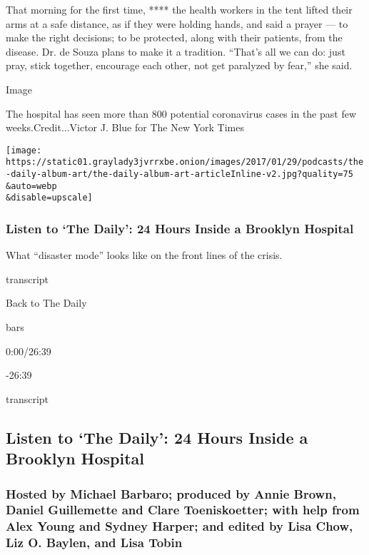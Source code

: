 That morning for the first time, **** the health workers in the tent
lifted their arms at a safe distance, as if they were holding hands, and
said a prayer --- to make the right decisions; to be protected, along
with their patients, from the disease. Dr. de Souza plans to make it a
tradition. ``That's all we can do: just pray, stick together, encourage
each other, not get paralyzed by fear,'' she said.

Image

The hospital has seen more than 800 potential coronavirus cases in the
past few weeks.Credit...Victor J. Blue for The New York Times

\texttt{[image: https://static01.graylady3jvrrxbe.onion/images/2017/01/29/podcasts/the-daily-album-art/the-daily-album-art-articleInline-v2.jpg?quality=75\\\&auto=webp\\\&disable=upscale]}

\hypertarget{listen-to-the-daily-24-hours-inside-a-brooklyn-hospital}{%
\subsubsection{Listen to `The Daily': 24 Hours Inside a Brooklyn
Hospital}\label{listen-to-the-daily-24-hours-inside-a-brooklyn-hospital}}

What ``disaster mode'' looks like on the front lines of the crisis.

transcript

Back to The Daily

bars

0:00/26:39

-26:39

transcript

\hypertarget{listen-to-the-daily-24-hours-inside-a-brooklyn-hospital-1}{%
\subsection{Listen to `The Daily': 24 Hours Inside a Brooklyn
Hospital}\label{listen-to-the-daily-24-hours-inside-a-brooklyn-hospital-1}}

\hypertarget{hosted-by-michael-barbaro-produced-by-annie-brown-daniel-guillemette-and-clare-toeniskoetter-with-help-from-alex-young-and-sydney-harper-and-edited-by-lisa-chow-liz-o-baylen-and-lisa-tobin}{%
\subsubsection{Hosted by Michael Barbaro; produced by Annie Brown,
Daniel Guillemette and Clare Toeniskoetter; with help from Alex Young
and Sydney Harper; and edited by Lisa Chow, Liz O. Baylen, and Lisa
Tobin}\label{hosted-by-michael-barbaro-produced-by-annie-brown-daniel-guillemette-and-clare-toeniskoetter-with-help-from-alex-young-and-sydney-harper-and-edited-by-lisa-chow-liz-o-baylen-and-lisa-tobin}}


